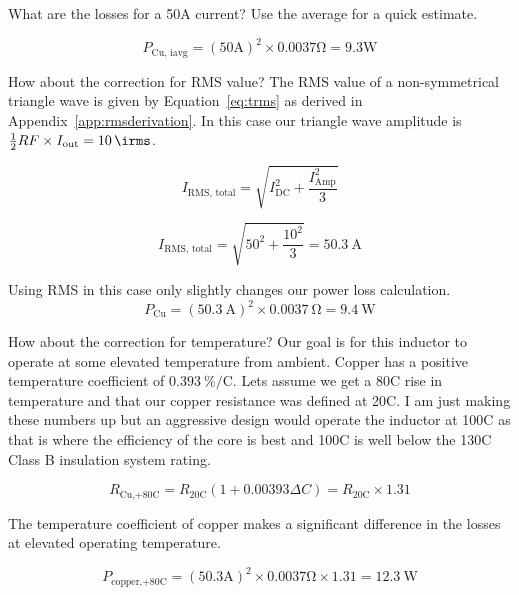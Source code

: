 \documentclass{article}
\begin{document}
What are the losses for a 50A current?  Use the average for a quick estimate.

\begin{equation}
P_\text{Cu, iavg} = (50 \text{A})^2 \times 0.0037 \si{\ohm} = 9.3 \text{W}
\end{equation}

How about the correction for RMS value?  The RMS value of a non-symmetrical triangle wave is given by Equation~\eqref{eq:trms} as derived in Appendix~\ref{app:rmsderivation}.  In this case our triangle wave amplitude is $\frac{1}{2} RF\times I_\text{out} = \SI{10}{\irms}$.

\begin{equation}
\label{eq:trms}
I_{\text{RMS, total}} = \sqrt{I_{\text{DC}}^2 + \frac{I_\text{Amp}^2}{3}}
\end{equation}

\begin{equation}
I_{\text{RMS, total}} = \sqrt{50^2 + \frac{10^2}{3}} = \SI{50.3}{\ampere}
\end{equation}

Using RMS in this case only slightly changes our power loss calculation.
\begin{equation}
P_\text{Cu} = (\SI{50.3}{\ampere})^2 \times \SI{0.0037}{\ohm} = \SI{9.4}{\watt}
\end{equation}

How about the correction for temperature?  Our goal is for this inductor to operate at some elevated temperature from ambient.  Copper has a positive temperature coefficient of $\SI{0.393}{\%\per\text{C}}$.  Lets assume we get a 80C rise in temperature and that our copper resistance was defined at 20C.  I am just making these numbers up but an aggressive design would operate the inductor at 100C as that is where the efficiency of the core is best and 100C is well below the 130C Class B insulation system rating.

\begin{equation}
R_\text{Cu,+80C} = R_\text{20C} (1 + 0.00393 \Delta C) = R_\text{20C} \times 1.31
\end{equation}

The temperature coefficient of copper makes a significant difference in the losses at elevated operating temperature.

\begin{equation}
P_\text{copper,+80C} = (50.3 \text{A})^2 \times 0.0037 \si{\ohm} \times 1.31 = \SI{12.3}{\watt}
\end{equation}
\end{document}
